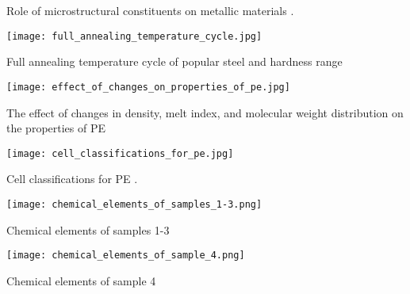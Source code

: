 {\begin{table}[H]
\caption{Role of microstructural constituents on metallic materials \cite{suryanarayana2017microstructure}.}
\label{appendix:c:5}
\end{table}}

\begin{table}[H]
    \texttt{[image: full\_annealing\_temperature\_cycle.jpg]}
    \caption{Full annealing temperature cycle of popular steel and hardness range \cite{singh2020applied}}
\end{table}

\begin{table}[H]
    \texttt{[image: effect\_of\_changes\_on\_properties\_of\_pe.jpg]}
    \caption{The effect of changes in density, melt index, and molecular weight distribution on the properties of PE \cite{gabriel1998history}}
\end{table}

\begin{table}[H]
    \texttt{[image: cell\_classifications\_for\_pe.jpg]}
    \caption{Cell classifications for PE \cite{meola2005cross}.}
    \label{appendix:classifications}
\end{table}

\begin{table}[H]
    \texttt{[image: chemical\_elements\_of\_samples\_1-3.png]}
    \caption{Chemical elements of samples 1-3}
\end{table}

\begin{table}[H]
    \texttt{[image: chemical\_elements\_of\_sample\_4.png]}
    \caption{Chemical elements of sample 4}
\end{table}